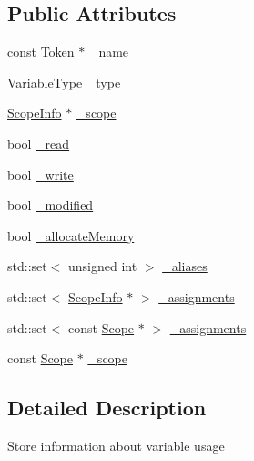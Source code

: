 \subsection*{Public Attributes}
\begin{DoxyCompactItemize}
\item 
const \hyperlink{class_token}{Token} $\ast$ \hyperlink{class_variables_1_1_variable_usage_ab8194156ce508b6246c4aab32d0eb568}{\-\_\-name}
\item 
\hyperlink{class_variables_a1ce977f31f855a0966511a93b9deb9b6}{Variable\-Type} \hyperlink{class_variables_1_1_variable_usage_a0a62412f6544ea9bc298eec96e04fe30}{\-\_\-type}
\item 
\hyperlink{class_scope_info}{Scope\-Info} $\ast$ \hyperlink{class_variables_1_1_variable_usage_a8c816e5988dcdf7aca3909ec7772cf43}{\-\_\-scope}
\item 
bool \hyperlink{class_variables_1_1_variable_usage_acc9633f1a38a4196f1b824fb5cde94bd}{\-\_\-read}
\item 
bool \hyperlink{class_variables_1_1_variable_usage_a5e3ffabcd11826559744904877088aad}{\-\_\-write}
\item 
bool \hyperlink{class_variables_1_1_variable_usage_ace627987ffa49dd9a7db0471d057abe4}{\-\_\-modified}
\item 
bool \hyperlink{class_variables_1_1_variable_usage_a5741213a6dd74bcd1358b288c86bd455}{\-\_\-allocate\-Memory}
\item 
std\-::set$<$ unsigned int $>$ \hyperlink{class_variables_1_1_variable_usage_affb574d671d4bd26157faac587931e3c}{\-\_\-aliases}
\item 
std\-::set$<$ \hyperlink{class_scope_info}{Scope\-Info} $\ast$ $>$ \hyperlink{class_variables_1_1_variable_usage_ab8ea544aaf7d6bcb483064da497002f0}{\-\_\-assignments}
\item 
std\-::set$<$ const \hyperlink{class_scope}{Scope} $\ast$ $>$ \hyperlink{class_variables_1_1_variable_usage_afa7089f2e61d22540f2337033ff80ece}{\-\_\-assignments}
\item 
const \hyperlink{class_scope}{Scope} $\ast$ \hyperlink{class_variables_1_1_variable_usage_a5aeafaa3bb6cdc2afac0d117b0f416b3}{\-\_\-scope}
\end{DoxyCompactItemize}


\subsection{Detailed Description}
Store information about variable usage 

